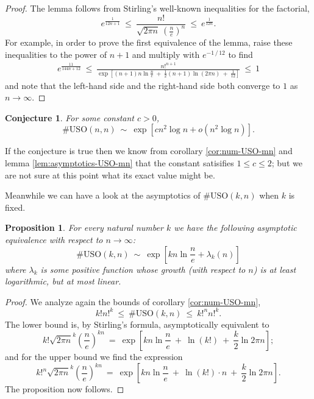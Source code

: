 \documentclass[a4paper,10pt]{article}
\newtheorem{prop}{Proposition}
\newtheorem{conjecture}{Conjecture}
\newcommand{\USO}{\ensuremath{\mathrm{USO}}}
\begin{document}
\begin{proof}
    The lemma follows from Stirling's well-known inequalities for the factorial,
    \[
        e ^ \frac{1}{12n+1}
        ~\le~
        \frac{ n! }{ \sqrt{2 \pi n} ~ \left( \frac{n}{e} \right) ^ n }
        ~\le~
        e ^ \frac{1}{12n} .
    \]
    For example, in order to prove the first equivalence of the lemma, raise
    these inequalities to the power of $n+1$ and multiply with
    $e ^ { -1\,/\,12 }$ to find
    \begin{align*}
        e ^ \frac{11}{144n+12}
        ~\le~
        \frac{ n!^{n+1} }{ \exp \left[
                                    (n+1) n \ln \frac{n}{e} ~+~
                                    \frac{1}{2} (n+1) \ln (2 \pi n)
                                    ~+~ \frac{1}{12} \right] }
        ~\le~
        1
    \end{align*}
    and note that the left-hand side and the right-hand side both converge to $1$
    as $n \to \infty$.
\end{proof}

\begin{conjecture}
    For some constant $c > 0$,
    \[
        \#\USO(n,n) ~\sim~ \exp\left[ c n^2 \log n + o(n^2 \log n) \right].
    \]
\end{conjecture}

\noindent
If the conjecture is true then we know from corollary \ref{cor:num-USO-mn} and
lemma \ref{lem:asymptotics-USO-mn} that the constant satisifies $1 \le c \le
2$; but we are not sure at this point what its exact value might be.

Meanwhile we can have a look at the asymptotics of $\#\USO(k,n)$ when $k$ is
fixed.

\begin{prop}
    \label{prop:asymptotics-USO-kn}
    For every natural number $k$ we have the following asymptotic
    equivalence with respect to $n \to \infty$:
    \[
        \#\USO(k,n) ~\sim~ \exp\left[
            k n \ln \frac{n}{e} + \lambda_k(n)
        \right]
    \]
    where $\lambda_k$ is some positive function whose growth (with respect to
    $n$) is at least logarithmic, but at most linear.
\end{prop}

\begin{proof}
    We analyze again the bounds of corollary \ref{cor:num-USO-mn},
    \[
        k! n!^k ~\le~ \#\USO(k,n) ~\le~ k!^n n!^k.
    \]
    The lower bound is, by Stirling's formula, asymptotically equivalent to
    \[
        k! \sqrt{2 \pi n} ^ k \left( \frac{n}{e} \right)^{kn}
        ~=~
        \exp \left[
            kn \ln \frac{n}{e} ~+~ \ln (k!) ~+~ \frac{k}{2} \ln {2 \pi n}
        \right];
    \]
    and for the upper bound we find the expression
    \[
        k! ^ n \sqrt{2 \pi n} ^ k \left( \frac{n}{e} \right) ^ {kn}
        ~=~
        \exp \left[
            k n \ln \frac{n}{e} ~+~ \ln (k!) \cdot n ~+~ \frac{k}{2} \ln 2 \pi n
        \right].
    \]
    The proposition now follows.
\end{proof}



\end{document}
